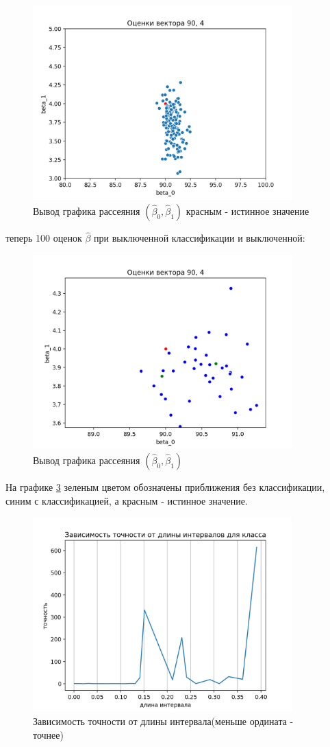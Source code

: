 \documentclass[a4paper,14pt]{extarticle}
\begin{document}
\newpage
\begin{figure}[ht!]
    \centering
    \includegraphics[width=100mm]{pics/plot_90_4_(2).png}
    \caption{Вывод графика рассеяния $(\hat{\beta}_0,\hat{\beta}_1)$ красным - истинное значение\label{overflow}}
\end{figure}
\hfill\break
теперь  100 оценок $\hat{\beta}$ при выключенной классификации и выключенной:
\begin{figure}[h]
    \centering
    \includegraphics[width=100mm]{pics/plot_90_4_with-without_(2).png}
    \caption{Вывод графика рассеяния $(\hat{\beta}_0,\hat{\beta}_1)$\label{overflow}}
    \label{pic_3}
\end{figure}
\break
На графике \ref{pic_3} зеленым цветом обозначены приближения без классификации, синим с классификацией, а красным - истинное значение.
\newpage
\begin{figure}[ht]
    \centering
    \includegraphics[width=100mm]{pics/plot_90_4_accuracy-length.png}
    \caption{Зависимость точности от длины интервала(меньше ордината - точнее)\label{overflow}}
    \label{pic_3}
\end{figure}
\end{document}
